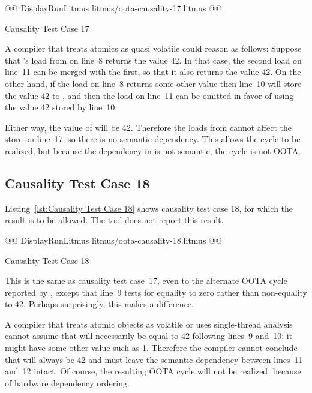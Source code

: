 \documentclass[10]{article}
\begin{document}
\begin{listing}[tbp]
@@ DisplayRunLitmus litmus/oota-causality-17.litmus @@
\caption{Causality Test Case 17}
\label{lst:Causality Test Case 17}
\end{listing}

A compiler that treats atomics as quasi volatile could reason as follows:
Suppose that 's load from  on line~8 returns the value 42.
In that case, the second load on line~11 can be merged with the first,
so that it also returns the value 42.
On the other hand, if the load on line~8 returns some other value then
line~10 will store the value 42 to , and then the load on line~11
can be omitted in favor of using the value 42 stored by line~10.

Either way, the value of  will be 42.
Therefore the loads from  cannot affect the store on line~17,
so there is no semantic dependency.
This allows the cycle to be realized,
but because the dependency in  is not semantic,
the cycle is not OOTA.

\subsection{Causality Test Case 18}
\label{app:Causality Test Case 18}

Listing~\ref{lst:Causality Test Case 18}
shows causality test case 18, for which the 
result is to be allowed.
The  tool does not report this result.

\begin{listing}[tbp]
@@ DisplayRunLitmus litmus/oota-causality-18.litmus @@
\caption{Causality Test Case 18}
\label{lst:Causality Test Case 18}
\end{listing}

This is the same as causality test case~17, even to the alternate OOTA
cycle reported by , except that line~9 tests
 for equality to zero rather than non-equality to 42.
Perhaps surprisingly, this makes a difference.

A compiler that treats atomic objects as volatile or uses
single-thread analysis cannot assume that  will necessarily be
equal to 42 following lines~9 and~10; it might have some other value
such as 1.
Therefore the compiler cannot conclude that  will always be 42
and must leave the semantic dependency between lines~11 and~12 intact.
Of course, the resulting OOTA cycle will not be realized, because of
hardware dependency ordering.
\end{document}
